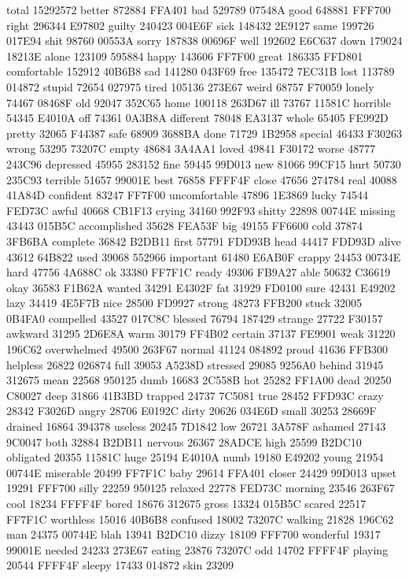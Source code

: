 
total 15292572 better 872884 FFA401 bad 529789 07548A good 648881 FFF700
right 296344 E97802 guilty 240423 004E6F sick 148432 2E9127 same 199726
017E94 shit 98760 00553A sorry 187838 00696F well 192602 E6C637 down
179024 18213E alone 123109 595884 happy 143606 FF7F00 great 186335
FFD801 comfortable 152912 40B6B8 sad 141280 043F69 free 135472 7EC31B
lost 113789 014872 stupid 72654 027975 tired 105136 273E67 weird 68757
F70059 lonely 74467 08468F old 92047 352C65 home 100118 263D67 ill
73767 11581C horrible 54345 E4010A off 74361 0A3B8A different 78048
EA3137 whole 65405 FE992D pretty 32065 F44387 safe 68909 3688BA done
71729 1B2958 special 46433 F30263 wrong 53295 73207C empty 48684 3A4AA1
loved 49841 F30172 worse 48777 243C96 depressed 45955 283152 fine 59445
99D013 new 81066 99CF15 hurt 50730 235C93 terrible 51657 99001E best
76858 FFFF4F close 47656 274784 real 40088 41A84D confident 83247
FF7F00 uncomfortable 47896 1E3869 lucky 74544 FED73C awful 40668 CB1F13
crying 34160 992F93 shitty 22898 00744E missing 43443 015B5C
accomplished 35628 FEA53F big 49155 FF6600 cold 37874 3FB6BA complete
36842 B2DB11 first 57791 FDD93B head 44417 FDD93D alive 43612 64B822
used 39068 552966 important 61480 E6AB0F crappy 24453 00734E hard 47756
4A688C ok 33380 FF7F1C ready 49306 FB9A27 able 50632 C36619 okay 36583
F1B62A wanted 34291 E4302F fat 31929 FD0100 sure 42431 E49202 lazy
34419 4E5F7B nice 28500 FD9927 strong 48273 FFB200 stuck 32005 0B4FA0
compelled 43527 017C8C blessed 76794 187429 strange 27722 F30157
awkward 31295 2D6E8A warm 30179 FF4B02 certain 37137 FE9901 weak 31220
196C62 overwhelmed 49500 263F67 normal 41124 084892 proud 41636 FFB300
helpless 26822 026874 full 39053 A5238D stressed 29085 9256A0 behind
31945 312675 mean 22568 950125 dumb 16683 2C558B hot 25282 FF1A00 dead
20250 C80027 deep 31866 41B3BD trapped 24737 7C5081 true 28452 FFD93C
crazy 28342 F3026D angry 28706 E0192C dirty 20626 034E6D small 30253
28669F drained 16864 394378 useless 20245 7D1842 low 26721 3A578F
ashamed 27143 9C0047 both 32884 B2DB11 nervous 26367 28ADCE high 25599
B2DC10 obligated 20355 11581C huge 25194 E4010A numb 19180 E49202 young
21954 00744E miserable 20499 FF7F1C baby 29614 FFA401 closer 24429
99D013 upset 19291 FFF700 silly 22259 950125 relaxed 22778 FED73C
morning 23546 263F67 cool 18234 FFFF4F bored 18676 312675 gross 13324
015B5C scared 22517 FF7F1C worthless 15016 40B6B8 confused 18002 73207C
walking 21828 196C62 man 24375 00744E blah 13941 B2DC10 dizzy 18109
FFF700 wonderful 19317 99001E needed 24233 273E67 eating 23876 73207C
odd 14702 FFFF4F playing 20544 FFFF4F sleepy 17433 014872 skin 23209
